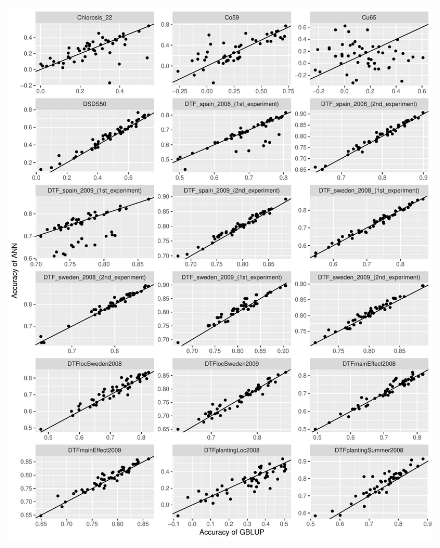 \begin{figure}[H]
  \centering \includegraphics[height=1.05\textheight, width=1.1\textwidth]{Figures/cor_plots_2}
  \decoRule
 \label{fig:bla}
\end{figure}

